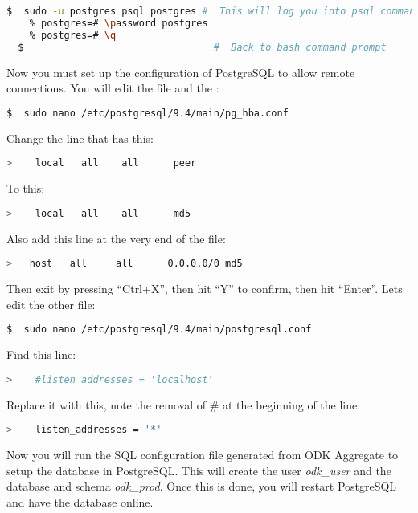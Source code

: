 \begin{lstlisting}[language=bash]
  $  sudo -u postgres psql postgres #  This will log you into psql command prompt.
    % postgres=# \password postgres
    % postgres=# \q
  $                                 #  Back to bash command prompt
\end{lstlisting}

Now you must set up the configuration of PostgreSQL to allow remote connections. You will edit the  file and the :

\begin{lstlisting}[language=bash]
  $  sudo nano /etc/postgresql/9.4/main/pg_hba.conf
\end{lstlisting}

Change the line that has this:
\begin{lstlisting}[language=bash]
  >    local   all    all      peer
\end{lstlisting}
\noindent
To this:
\begin{lstlisting}[language=bash]
  >    local   all    all      md5
\end{lstlisting}

Also add this line at the very end of the file:
\begin{lstlisting}[language=bash]
  >   host   all     all      0.0.0.0/0 md5
\end{lstlisting}

Then exit by pressing ``Ctrl+X'', then hit ``Y'' to confirm, then hit ``Enter''. Lets edit the other file:

\begin{lstlisting}[language=bash]
  $  sudo nano /etc/postgresql/9.4/main/postgresql.conf
\end{lstlisting}

Find this line:
\begin{lstlisting}[language=bash]
  >    #listen_addresses = 'localhost'
\end{lstlisting}

Replace it with this, note the removal of  \# at the beginning of the line:

\begin{lstlisting}[language=bash]
  >    listen_addresses = '*'
\end{lstlisting}


Now you will run the SQL configuration file generated from ODK Aggregate to setup the database in PostgreSQL. This will create the user \emph{odk\_user} and the database and schema \emph{odk\_prod}. Once this is done, you will restart PostgreSQL and have the database online.

